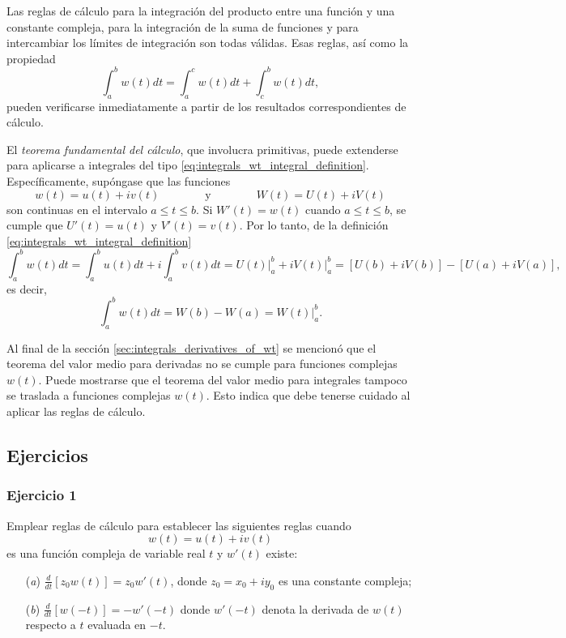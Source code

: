 \documentclass[a4paper]{report}
\begin{document}
Las reglas de cálculo para la integración del producto entre una función y una constante compleja, para la integración de la suma de funciones y para intercambiar los límites de integración son todas válidas. Esas reglas, así como la propiedad
\[
 \int_a^b w(t)dt=\int_a^c w(t)dt+\int_c^b w(t)dt,
\]
pueden verificarse inmediatamente a partir de los resultados correspondientes de cálculo.

El \emph{teorema fundamental del cálculo}, que involucra primitivas, puede extenderse para aplicarse a integrales del tipo \ref{eq:integrals_wt_integral_definition}. Específicamente, supóngase que las funciones 
\[
 w(t)=u(t)+iv(t)
 \qquad\qquad\textrm{y}\qquad\qquad
 W(t)=U(t)+iV(t)
\]
son continuas en el intervalo \(a\leq t\leq b\). Si \(W'(t)=w(t)\) cuando \(a\leq t\leq b\), se cumple que \(U'(t)=u(t)\) y \(V'(t)=v(t)\). Por lo tanto, de la definición \ref{eq:integrals_wt_integral_definition}
\[
 \int_a^b w(t)dt=\int_a^b u(t)dt+i\int_a^b v(t)dt=U(t)\bigg|_a^b+iV(t)\bigg|_a^b
 =[U(b)+iV(b)]-[U(a)+iV(a)],
\]
es decir,
\begin{equation}\label{eq:integrals_wt_fundamental_theorem_calculus}
 \int_a^b w(t)dt=W(b)-W(a)=W(t)\bigg|_a^b. 
\end{equation}

Al final de la sección \ref{sec:integrals_derivatives_of_wt} se mencionó que el teorema del valor medio para derivadas no se cumple para funciones complejas \(w(t)\). Puede mostrarse que el teorema del valor medio para integrales tampoco se traslada a funciones complejas \(w(t)\). Esto indica que debe tenerse cuidado al aplicar las reglas de cálculo.

\subsection*{Ejercicios}

\subsubsection{Ejercicio 1}

Emplear reglas de cálculo para establecer las siguientes reglas cuando
\[
 w(t)=u(t)+iv(t)
\]
es una función compleja de variable real \(t\) y \(w'(t)\) existe:
\begin{enumerate}
 \item[(\textit{a})] \(\displaystyle\frac{d}{dt}[z_0w(t)]=z_0w'(t)\), donde \(z_0=x_0+iy_0\) es una constante compleja;
 \item[(\textit{b})] \(\displaystyle\frac{d}{dt}[w(-t)]=-w'(-t)\) donde \(w'(-t)\) denota la derivada de \(w(t)\) respecto a \(t\) evaluada en \(-t\).
\end{enumerate}
\end{document}
